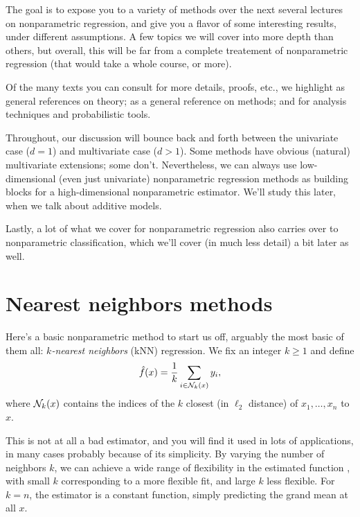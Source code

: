 \documentclass{article}
\begin{document}
The goal is to expose you to a variety of methods over the next several lectures
on nonparametric regression, and give you a flavor of some interesting results,
under different assumptions. A few topics we will cover into more depth than
others, but overall, this will be far from a complete treatement of
nonparametric regression (that would take a whole course, or more).  

Of the many texts you can consult for more details, proofs, etc., we highlight
\citet{gyorfi2002distribution, wasserman2006all, tsybakov2009introduction} as
general references on theory; \citet{hastie2009elements} as a general reference
on methods; and \citet{vandegeer2000empirical, wainwright2019high} for analysis
techniques and probabilistic tools.

Throughout, our discussion will bounce back and forth between the univariate
case ($d=1$) and multivariate case ($d>1$). Some methods have obvious (natural) 
multivariate extensions; some don't. Nevertheless, we can always use
low-dimensional (even just univariate) nonparametric regression methods as
building blocks for a high-dimensional nonparametric estimator. We'll study
this later, when we talk about additive models.

Lastly, a lot of what we cover for nonparametric regression also carries over to
nonparametric classification, which we'll cover (in much less detail) a bit
later as well.

\section{Nearest neighbors methods}

Here's a basic nonparametric method to start us off, arguably the most basic of
them all: \emph{$k$-nearest neighbors} (kNN) regression. We fix an integer $k
\geq 1$ and define 
\begin{equation}
\label{eq:knn}
\hat{f}(x) = \frac{1}{k} \sum_{i \in \mathcal{N}_k(x)} y_i,
\end{equation}
where $\mathcal{N}_k(x)$ contains the indices of the $k$ closest (in $\ell_2$ distance)
of $x_1,\dots,x_n$ to $x$. 

This is not at all a bad estimator, and you will find it used in lots of
applications, in many cases probably because of its simplicity. By varying the 
number of neighbors $k$, we can achieve a wide range of flexibility in the
estimated function \smash{$\hf$}, with small $k$ corresponding to a more
flexible fit, and large $k$ less flexible. For $k=n$, the estimator
\smash{$\hf$} is a constant function, simply predicting the grand mean
 at all $x$.
\end{document}
